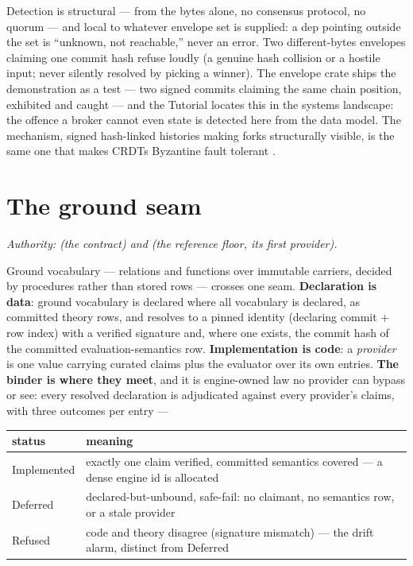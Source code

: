\noindent Detection is structural — from the bytes alone, no
consensus protocol, no quorum — and local to whatever envelope set is
supplied: a dep pointing outside the set is ``unknown, not
reachable,'' never an error. Two different-bytes envelopes claiming
one commit hash refuse loudly (a genuine hash collision or a hostile
input; never silently resolved by picking a winner). The envelope
crate ships the demonstration as a test — two signed commits claiming
the same chain position, exhibited and caught — and the Tutorial
locates this in the systems landscape: the offence a broker cannot
even state is detected here from the data model. The mechanism,
signed hash-linked histories making forks structurally visible, is
the same one that makes CRDTs Byzantine fault tolerant
\cite{kleppmann22}.

\section{The ground seam}
\label{sec:gr-ground}

\emph{Authority:  (the contract) and
 (the reference floor, its first
provider).}

Ground vocabulary — relations and functions over immutable carriers,
decided by procedures rather than stored rows — crosses one seam.
\textbf{Declaration is data}: ground vocabulary is declared where all
vocabulary is declared, as committed theory rows, and resolves to a
pinned identity (declaring commit + row index) with a verified
signature and, where one exists, the commit hash of the committed
evaluation-semantics row. \textbf{Implementation is code}: a
\emph{provider} is one value carrying curated claims plus the
evaluator over its own entries. \textbf{The binder is where they
meet}, and it is engine-owned law no provider can bypass or see:
every resolved declaration is adjudicated against every provider's
claims, with three outcomes per entry —

\begin{center}
\small
\begin{tabular}{ll}
\toprule
status & meaning \\
\midrule
Implemented & exactly one claim verified, committed semantics covered — a dense engine id is allocated \\
Deferred & declared-but-unbound, safe-fail: no claimant, no semantics row, or a stale provider \\
Refused & code and theory disagree (signature mismatch) — the drift alarm, distinct from Deferred \\
\bottomrule
\end{tabular}
\end{center}

